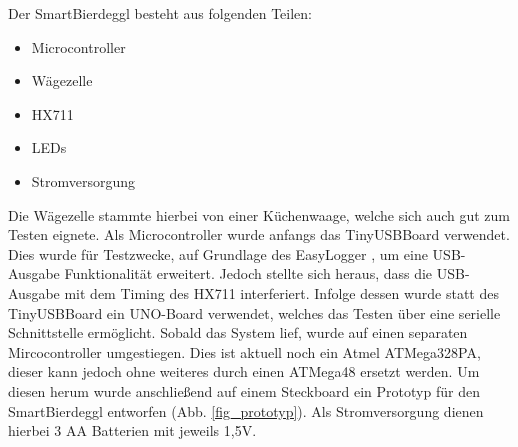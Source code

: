 \documentclass[12pt,journal]{IEEEtran}
\begin{document}
\noindent
Der SmartBierdeggl besteht aus folgenden Teilen:
\begin{itemize}
\item Microcontroller
\item Wägezelle
\item HX711
\item LEDs
\item Stromversorgung
\end{itemize}
Die Wägezelle stammte hierbei von einer Küchenwaage, welche sich auch gut zum Testen eignete.
Als Microcontroller wurde anfangs das TinyUSBBoard \cite{tinyusb} verwendet.
Dies wurde für Testzwecke, auf Grundlage des EasyLogger \cite{easylogger}, um eine USB-Ausgabe Funktionalität erweitert.
Jedoch stellte sich heraus, dass die USB-Ausgabe mit dem Timing des HX711 interferiert.
Infolge dessen wurde statt des TinyUSBBoard  ein UNO-Board verwendet, welches das Testen über eine serielle Schnittstelle ermöglicht.
Sobald das System lief, wurde auf einen separaten Mircocontroller umgestiegen.
Dies ist aktuell noch ein Atmel ATMega328PA, dieser kann jedoch ohne weiteres durch einen ATMega48 ersetzt werden.
Um diesen herum wurde anschließend auf einem Steckboard ein Prototyp für den SmartBierdeggl entworfen (Abb. \ref{fig_prototyp}).
Als Stromversorgung dienen hierbei 3 AA Batterien mit jeweils 1,5V.
\end{document}
